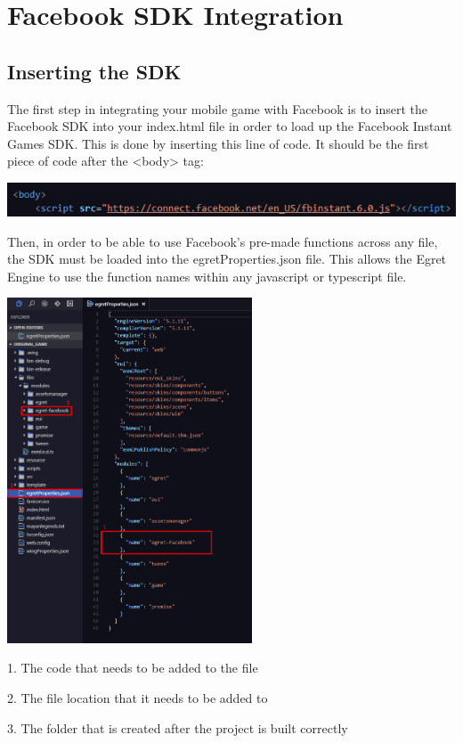 \documentclass{article}
\begin{document}
\tableofcontents

\newpage
{}

\section{Facebook SDK Integration}
\subsection{Inserting the SDK}
The first step in integrating your mobile game with Facebook is to insert the Facebook SDK into your index.html file in order to load up the Facebook Instant Games SDK. This is done by inserting this line of code. It should be the first piece of code after the <body> tag:

\includegraphics[]{FacebookIndex.png}


Then, in order to be able to use Facebook's pre-made functions across any file, the SDK must be loaded into the egretProperties.json file. This allows the Egret Engine to use the function names within any javascript or typescript file.

\begin{center}
\includegraphics[width = 275px]{images/FacebookSDK.png}
\end{center}

\begin{center}
1. The code that needs to be added to the file \par
2. The file location that it needs to be added to \par
3. The folder that is created after the project is built correctly \par
\end{center}
\end{document}
